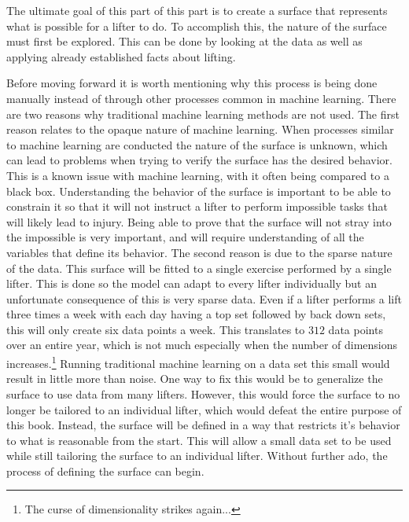 The ultimate goal of this part of this part is to create a surface that represents what is possible for a lifter to do. To accomplish this, the nature of the surface must first be explored. This can be done by looking at the data as well as applying already established facts about lifting.

Before moving forward it is worth mentioning why this process is being done manually instead of through other processes common in machine learning. There are two reasons why traditional machine learning methods are not used. The first reason relates to the opaque nature of machine learning. When processes similar to machine learning are conducted the nature of the surface is unknown, which can lead to problems when trying to verify the surface has the desired behavior. This is a known issue with machine learning, with it often being compared to a black box. Understanding the behavior of the surface is important to be able to constrain it so that it will not instruct a lifter to perform impossible tasks that will likely lead to injury. Being able to prove that the surface will not stray into the impossible is very important, and will require understanding of all the variables that define its behavior. The second reason is due to the sparse nature of the data. This surface will be fitted to a single exercise performed by a single lifter. This is done so the model can adapt to every lifter individually but an unfortunate consequence of this is very sparse data. Even if a lifter performs a lift three times a week with each day having a top set followed by back down sets, this will only create six data points a week. This translates to $312$ data points over an entire year, which is not much especially when the number of dimensions increases.\footnote{The curse of dimensionality strikes again...} Running traditional machine learning on a data set this small would result in little more than noise. One way to fix this would be to generalize the surface to use data from many lifters. However, this would force the surface to no longer be tailored to an individual lifter, which would defeat the entire purpose of this book. Instead, the surface will be defined in a way that restricts it's behavior to what is reasonable from the start. This will allow a small data set to be used while still tailoring the surface to an individual lifter. Without further ado, the process of defining the surface can begin.

